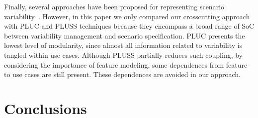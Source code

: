 \documentclass[11pt]{report}
\begin{document}
Finally, several approaches have been proposed for representing 
scenario variability~\cite{jacobson-reuse-book, favaro-icsr-98, eriksson-splc-2005,bertolino-esec-2003}. 
However, in this paper we only compared our crosscutting approach with PLUC and 
PLUSS techniques because they encompass a broad range of SoC between 
variability management and scenario specification. PLUC presents the lowest level of 
modularity, since almost all information related to variability is tangled within use 
cases. Although PLUSS partially reduces such coupling, by considering the 
importance of feature modeling, some dependences from feature to use cases are
still present. These dependences are avoided in our approach.


%

\section{Conclusions}\label{sec:conclusions}
\end{document}
